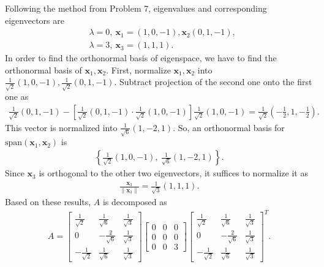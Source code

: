 \documentclass{article}
\begin{document}
\begin{enumerate}
Following the method from Problem 7, eigenvalues and corresponding eigenvectors are
	\begin{align*}
	&\lambda=0, ~\mathbf{x}_1=(1,0,-1), \mathbf{x}_2(0,1,-1),\\
	&\lambda=3, ~\mathbf{x}_3=(1,1,1).	
	\end{align*}
In order to find the orthonormal basis of eigenspace, we have to find the orthonormal basis of $\mathbf{x}_1,\mathbf{x}_2$.
First, normalize $\mathbf{x}_1,\mathbf{x}_2$ into $\frac{1}{\sqrt{2}}(1,0,-1),\frac{1}{\sqrt{2}}(0,1,-1)$. 
Subtract projection of the second one onto the first one as
	\begin{align*}
	\frac{1}{\sqrt{2}}(0,1,-1)-\left[\frac{1}{\sqrt{2}}(0,1,-1)\cdot 	\frac{1}{\sqrt{2}}(1,0,-1)\right] \frac{1}{\sqrt{2}}(1,0,-1)=\frac{1}{\sqrt{2}}\left(-\frac{1}{2},1,-\frac{1}{2}\right).
	\end{align*}
This vector is normalized into $\frac{1}{\sqrt{6}}(1,-2,1)$.
So, an orthonormal basis for $\text{span}(\mathbf{x}_1,\mathbf{x}_2)$ is
	\begin{align*}
	\left\{ \frac{1}{\sqrt{2}}(1,0,-1),~ 	\frac{1}{\sqrt{6}}(1,-2,1)\right\}.
	\end{align*}
Since $\mathbf{x}_3$ is orthogonal to the other two eigenvectors, it suffices to normalize it as
	\begin{align*}
	\frac{\mathbf{x}_3}{\|\mathbf{x}_3\|}=\frac{1}{\sqrt{3}}(1,1,1).	
	\end{align*}
Based on these results, $A$ is decomposed as
	\begin{align*}
	A=	\left[ \begin{array}{lll} \frac{1}{\sqrt{2}}&\frac{1}{\sqrt{6}}&\frac{1}{\sqrt{3}} \\ 0&-\frac{2}{\sqrt{6}} & \frac{1}{\sqrt{3}}\\ -\frac{1}{\sqrt{2}} & \frac{1}{\sqrt{6}} & \frac{1}{\sqrt{3}}\end{array}\right]\left[ \begin{array}{lll} 0&0&0 \\ 0&0&0 \\ 0&0&3\end{array}\right]\left[ \begin{array}{lll} \frac{1}{\sqrt{2}}&\frac{1}{\sqrt{6}}&\frac{1}{\sqrt{3}} \\ 0&-\frac{2}{\sqrt{6}} & \frac{1}{\sqrt{3}}\\ -\frac{1}{\sqrt{2}} & \frac{1}{\sqrt{6}} & \frac{1}{\sqrt{3}}\end{array}\right]^T.
	\end{align*}


\end{enumerate}
\end{document}
